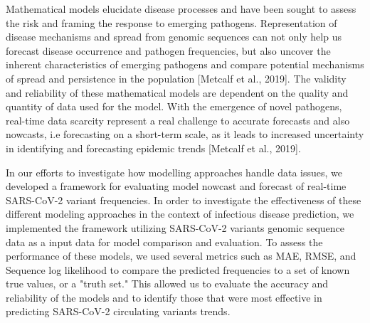 \documentclass[11pt,oneside,letterpaper]{article}
\begin{document}
Mathematical models elucidate disease processes and have been sought to assess the risk and framing the response to emerging pathogens. 
Representation of disease mechanisms and spread from genomic sequences can not only help us forecast disease occurrence and pathogen frequencies, but also uncover the inherent characteristics of emerging pathogens and compare potential mechanisms of spread and persistence in the population [Metcalf et al., 2019].
The validity and reliability of these mathematical models are dependent on the quality and quantity of data used for the model.
With the emergence of novel pathogens, real-time data scarcity represent a real challenge to accurate forecasts and also nowcasts, i.e forecasting on a short-term scale, as it leads to 
increased uncertainty in identifying and forecasting epidemic trends [Metcalf et al., 2019].





In our efforts to investigate how modelling approaches handle data issues, we developed a framework for evaluating model nowcast and forecast of real-time SARS-CoV-2 variant frequencies.
In order to investigate the effectiveness of these different modeling approaches in the context of infectious disease prediction, we implemented the framework utilizing SARS-CoV-2 variants genomic sequence data as a input data for model comparison and evaluation.
To assess the performance of these models, we used several metrics such as MAE, RMSE, and Sequence log likelihood to compare the predicted frequencies to a set of known true values, or a "truth set." %
This allowed us to evaluate the accuracy and reliability of the models and to identify those that were most effective in predicting SARS-CoV-2 circulating variants trends.






\end{document}
